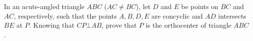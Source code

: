 In an acute-angled triangle $ABC$ ($AC\ne BC$), let $D$ and $E$ be points on $BC$ and $AC$, respectively, such that the points $A,B,D,E$ are concyclic and $AD$ intersects $BE$ at $P$. Knowing that $CP\bot AB$, prove that $P$ is the orthocenter of triangle $ABC$.